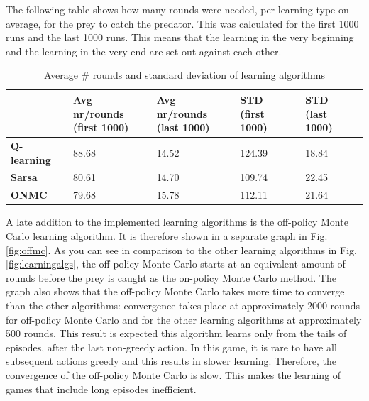 \documentclass{article}
\begin{document}

The following table shows how many rounds were needed, per learning type on average, for the prey to catch the predator. This was calculated for the first 1000 runs  and the last 1000 runs. This means that the learning in the very beginning and the learning in the very end are set out against each other.

\begin{table}[H]
\begin{center}
\begin{tabular}{| l | l | l | l | l |}
\hline
 & \parbox{2cm}{\textbf{Avg nr/rounds\\ (first 1000)}} & \parbox{2cm}{\textbf{Avg nr/rounds\\ (last 1000)}} & \parbox{2cm}{\textbf{STD\\ (first 1000)}} & \parbox{2cm}{\textbf{STD\\ (last 1000)}} \\
\hline
\textbf{Q-learning} & 88.68 & 14.52 & 124.39 & 18.84 \\
\hline
\textbf{Sarsa} & 80.61 & 14.70 & 109.74 & 22.45 \\
\hline
\textbf{ONMC} & 79.68 & 15.78 & 112.11 & 21.64 \\
\hline
\end{tabular}
\caption{Average \# rounds and standard deviation of learning algorithms}
\end{center}
\end{table}

A late addition to the implemented learning algorithms is the off-policy Monte Carlo learning algorithm. It is therefore shown in a separate graph in Fig. \ref{fig:offmc}. As you can see in comparison to the other learning algorithms in Fig. \ref{fig:learningalgs}, the off-policy Monte Carlo starts at an equivalent amount of rounds before the prey is caught as the on-policy Monte Carlo method. The graph also shows that the off-policy Monte Carlo takes more time to converge than the other algorithms: convergence takes place at approximately 2000 rounds for off-policy Monte Carlo and for the other learning algorithms at approximately 500 rounds. This result is expected this algorithm learns only from the tails of episodes, after the last non-greedy action. In this game, it is rare to have all subsequent actions greedy and this results in slower learning. Therefore, the convergence of the off-policy Monte Carlo is slow. This makes the learning of games that include long episodes inefficient.
\end{document}
